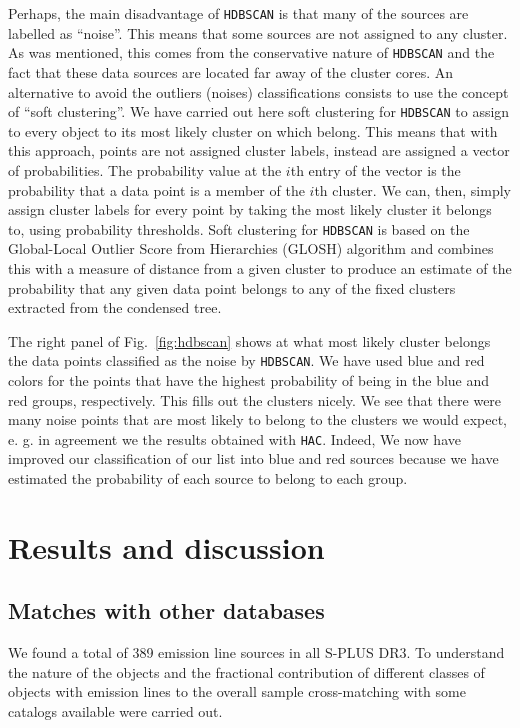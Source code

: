 \documentclass[fleqn,usenatbib]{mnras}
\begin{document}
Perhaps, the main disadvantage of \texttt{HDBSCAN} is that many of the sources are labelled
as ``noise''. This means that some sources are not assigned to any cluster. As was mentioned,
this comes from the conservative nature of \texttt{HDBSCAN}
and the fact that these data sources are located far away of the cluster cores.
An alternative to avoid the outliers (noises) classifications consists to use the concept 
of ``soft clustering''. We have carried out here soft
clustering for \texttt{HDBSCAN} to assign to every object to its most likely cluster on which belong.
This means that with this approach, points are not assigned cluster labels, instead are
assigned a vector of probabilities. The probability value at the $i$th entry of the vector
is the probability that a data point is a member of the $i$th cluster. We can, then, simply
assign cluster labels for every point by taking the most likely cluster it belongs to,
using probability thresholds. Soft clustering for \texttt{HDBSCAN} is based on the
Global-Local Outlier Score from Hierarchies (GLOSH) algorithm \citep{Campello:2015}
and combines this with a measure of distance from a given cluster to produce 
an estimate of the probability that any given data point belongs to any of the fixed 
clusters extracted from the condensed tree.

The right panel of Fig.~\ref{fig:hdbscan} shows at what most likely cluster belongs the data
points classified as the noise by \texttt{HDBSCAN}. We have used blue and red colors for the
points that have the highest probability of being in the blue and red groups, respectively.
This fills out the clusters nicely. We see that there were many noise points that are most
likely to belong to the clusters we would expect, e. g. in agreement we the results obtained
with \texttt{HAC}. Indeed, We now have improved our classification of our list into blue and 
red sources because we have estimated the probability of each source to belong
to each group.

\section{Results and discussion}
\label{sec:results}

\subsection{Matches with other databases}
\label{sec:matches}
We found a total of 389 emission line sources in all S-PLUS DR3.
To understand the nature of the objects  and the fractional
contribution of different classes of objects with emission lines
to the overall sample cross-matching with some catalogs available were carried out.
\end{document}
